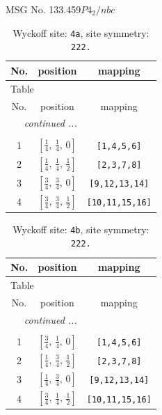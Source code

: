 \documentclass[fleqn,8pt]{jsarticle}
\begin{document}
\setcounter{MaxMatrixCols}{32}

\renewcommand{\tablename}{Table~}
\renewcommand{\figurename}{Figure~}
\begin{center}
\LARGE
MSG No. 133.459\quad$P4_{2}/nbc$
\end{center}
\renewcommand{\arraystretch}{1.2}
\begin{longtable}{ccc}
\caption{Wyckoff site: {\tt 4a}, site symmetry: {\tt 222.}}
 \\
 \hline \hline
No. & position & mapping \\ \hline \endfirsthead

\multicolumn{2}{l}{\tablename\ \thetable{}} \\
 \hline \hline
No. & position & mapping \\ \hline \endhead

 \hline \hline
\multicolumn{2}{r}{\footnotesize\it continued ...} \\ \endfoot

 \hline \hline
\multicolumn{2}{r}{} \\ \endlastfoot

1 & $\left[ \frac{1}{4},\, \frac{1}{4},\, 0 \right]$ & {\tt [1,4,5,6]} \\ \hline
2 & $\left[ \frac{1}{4},\, \frac{1}{4},\, \frac{1}{2} \right]$ & {\tt [2,3,7,8]} \\ \hline
3 & $\left[ \frac{3}{4},\, \frac{3}{4},\, 0 \right]$ & {\tt [9,12,13,14]} \\ \hline
4 & $\left[ \frac{3}{4},\, \frac{3}{4},\, \frac{1}{2} \right]$ & {\tt [10,11,15,16]} \\
\end{longtable}
\renewcommand{\arraystretch}{1.2}
\begin{longtable}{ccc}
\caption{Wyckoff site: {\tt 4b}, site symmetry: {\tt 222.}}
 \\
 \hline \hline
No. & position & mapping \\ \hline \endfirsthead

\multicolumn{2}{l}{\tablename\ \thetable{}} \\
 \hline \hline
No. & position & mapping \\ \hline \endhead

 \hline \hline
\multicolumn{2}{r}{\footnotesize\it continued ...} \\ \endfoot

 \hline \hline
\multicolumn{2}{r}{} \\ \endlastfoot

1 & $\left[ \frac{3}{4},\, \frac{1}{4},\, 0 \right]$ & {\tt [1,4,5,6]} \\ \hline
2 & $\left[ \frac{1}{4},\, \frac{3}{4},\, \frac{1}{2} \right]$ & {\tt [2,3,7,8]} \\ \hline
3 & $\left[ \frac{1}{4},\, \frac{3}{4},\, 0 \right]$ & {\tt [9,12,13,14]} \\ \hline
4 & $\left[ \frac{3}{4},\, \frac{1}{4},\, \frac{1}{2} \right]$ & {\tt [10,11,15,16]} \\
\end{longtable}
\end{document}
